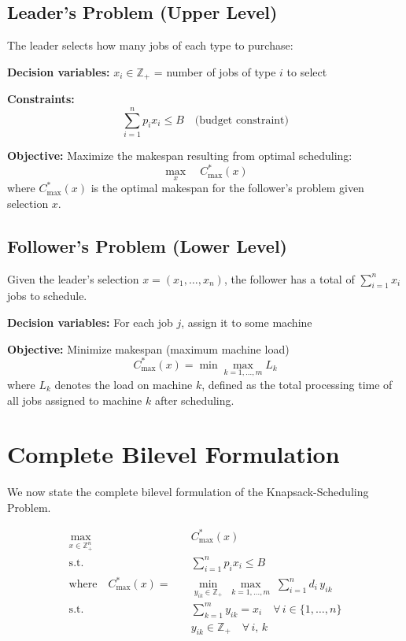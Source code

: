 \subsection{Leader's Problem (Upper Level)}

The leader selects how many jobs of each type to purchase:

\textbf{Decision variables:} $x_i \in \mathbb{Z}_+$ = number of jobs of type $i$ to select

\textbf{Constraints:}
\begin{equation}
\sum_{i=1}^{n} p_i x_i \leq B \quad \text{(budget constraint)}
\end{equation}

\textbf{Objective:} Maximize the makespan resulting from optimal scheduling:
\begin{equation}
\max_{x} \quad C_{\max}^*(x)
\end{equation}
where $C_{\max}^*(x)$ is the optimal makespan for the follower's problem given selection $x$.

\subsection{Follower's Problem (Lower Level)}

Given the leader's selection $x = (x_1, \ldots, x_n)$, the follower has a total of $\sum_{i=1}^{n} x_i$ jobs to schedule.

\textbf{Decision variables:} For each job $j$, assign it to some machine

\textbf{Objective:} Minimize makespan (maximum machine load)
\begin{equation}
C_{\max}^*(x) = \min \max_{k=1,\ldots,m} L_k
\end{equation}
where $L_k$ denotes the load on machine $k$, defined as the total processing time of all jobs assigned to machine $k$ after scheduling.

\section{Complete Bilevel Formulation}

We now state the complete bilevel formulation of the Knapsack-Scheduling Problem.

\begin{definition}
\label{def:ksp-bilevel}
\begin{align}
\max_{x\in\mathbb{Z}_+^n} \quad & C_{\max}^*(x) \label{eq:leader-obj}\\
\text{s.t.} \quad & \sum_{i=1}^{n} p_i x_i \leq B \label{eq:budget}\\[0.5ex]
\text{where}\quad C_{\max}^*(x) = \quad & \min_{y_{ik}\in\mathbb{Z}_+}\; \max_{k=1,\ldots,m}\; \sum_{i=1}^{n} d_i\, y_{ik} \label{eq:follower-obj}\\
\text{s.t.} \quad & \sum_{k=1}^{m} y_{ik} = x_i \quad \forall\, i \in \{1, \ldots, n\} \label{eq:assign}\\
& y_{ik} \in \mathbb{Z}_+ \quad \forall\, i,\, k \nonumber
\end{align}
\end{definition}


